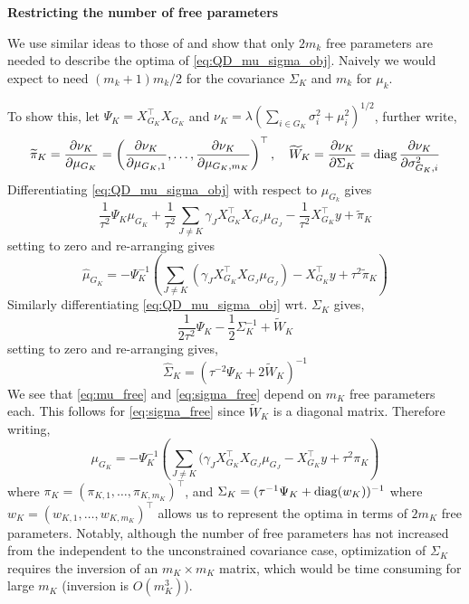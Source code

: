 \documentclass[12pt]{article}
\begin{document}
\textbf{Restricting the number of free parameters} 

We use similar ideas to those of \citep[pg. 119]{Seeger1999, Opper2009} and show that only $2m_k$ free parameters are needed to describe the optima of \eqref{eq:QD_mu_sigma_obj}. Naively we would expect to need $(m_k + 1)m_k /2 $ for the covariance $\Sigma_K$ and $m_k$ for $\mu_k$. 

To show this, let $\Psi_K = X_{G_K}^\top X_{G_K}$ and $\nu_K = \lambda (\sum_{i \in G_K} \sigma^2_i + \mu^2_i)^{1/2}$, further write,
\begin{equation}
    \widetilde{\pi}_K = \frac{\partial \nu_K}{\partial \mu_{G_K}} = 
    \left( \frac{ \partial \nu_K}{\partial \mu_{G_K, 1}}, \dots, \frac{\partial \nu_K}{\partial \mu_{G_K, m_K}} \right)^\top
    , \quad 
    \widetilde{W}_K = \frac{\partial \nu_K}{\partial \Sigma_{K}} = \operatorname{diag} \frac{\partial \nu_K}{\partial \sigma_{G_K, i}^2}
\end{equation}
Differentiating \eqref{eq:QD_mu_sigma_obj} with respect to $\mu_{G_k}$ gives
\begin{equation}
    \frac{1}{\tau^2} 
    \Psi_K \mu_{G_K}
+
    \frac{1}{\tau^2} 
    \sum_{J \neq K} 
	\gamma_J X_{G_K}^\top X_{G_J} \mu_{G_J}
-
    \frac{1}{\tau^2}
    X_{G_K}^\top y
+
    \widetilde{\pi}_K
\end{equation}
setting to zero and re-arranging gives
\begin{equation}  \label{eq:mu_free}
    \widehat{\mu}_{G_K} = 
 - \Psi_K^{-1} \left(  \sum_{J \neq K} 
	\left( \gamma_J X_{G_K}^\top X_{G_J} \mu_{G_J} \right)
-
    X_{G_K}^\top y
+
    \tau^2 \widetilde{\pi}_K \right)
\end{equation}
Similarly differentiating \eqref{eq:QD_mu_sigma_obj} wrt. $\Sigma_K$ gives,
\begin{equation} 
    \frac{1}{2\tau^2} \Psi_K
-	
    \frac{1}{2} \Sigma_K^{-1}
+
    \widetilde{W}_K
\end{equation}
setting to zero and re-arranging gives,
\begin{equation} \label{eq:sigma_free}
    \widehat{\Sigma}_K = \left( \tau^{-2} \Psi_K + 2\widetilde{W}_K \right)^{-1}
\end{equation}
We see that \eqref{eq:mu_free} and \eqref{eq:sigma_free} depend on $m_K$ free parameters each. This follows for \eqref{eq:sigma_free} since $\widetilde{W}_K$ is a diagonal matrix. Therefore writing, 
\begin{equation*}
\mu_{G_K} = -\Psi_K^{-1} \left( \sum_{J\neq K} (\gamma_J X^\top_{G_K} X_{G_J} \mu_{G_J} - X^\top_{G_K} y + \tau^2 \pi_K \right)
\end{equation*}
where $\pi_K = (\pi_{K,1}, \dots, \pi_{K, m_K})^\top$, and $\Sigma_K = (\tau^{-1} \Psi_K + \operatorname{diag}(w_K))^{-1}$ where $w_K = (w_{K,1}, \dots, w_{K, m_K})^\top$ allows us to represent the optima in terms of $2m_K$ free parameters. Notably, although the number of free parameters has not increased from the independent to the unconstrained covariance case, optimization of $\Sigma_K$ requires the inversion of an $m_K \times m_K$ matrix, which would be time consuming for large $m_K$ (inversion is $O(m_K^3)$).
\end{document}
